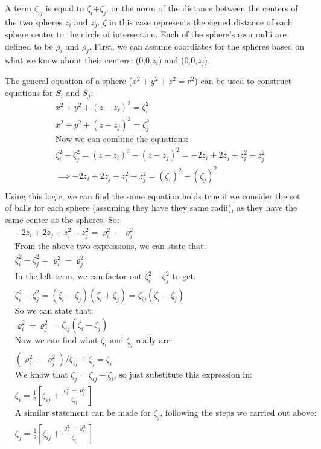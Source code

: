 \documentclass{article}
\begin{document}
A term $\zeta_{ij}$ is equal to  $\zeta_i$+$\zeta_j$, or the norm of the distance between the centers of the two spheres $z_i$ and $z_j$. $\zeta$ in this case represents the signed distance of each sphere center to the circle of intersection. Each of the sphere's own radii are defined to be $\rho_i$ and $\rho_j$. First, we can assume coordiates for the spheres based on what we know about their centers:
(0,0,$z_i$) and (0,0,$z_j$).


The general equation of a sphere ($x^2 + y^2 +z^2 = r^2$) can be used to construct equations for $S_i$ and $S_j$:
\begin{align*}
&x^2 + y^2 +(z-z_i)^2 = \zeta_i^2 \\
&x^2 + y^2 +(z-z_j)^2 = \zeta_j^2 \\
&\text{Now we can combine the equations:} \\
&\zeta_i^2-\zeta_j^2 =(z-z_i)^2-(z-z_j)^2=-2z_i +2z_j +z_i^2 - z_j^2\\
& \implies -2z_i +2z_j +z_i^2 - z_j^2 = (\zeta_i)^2-(\zeta_j)^2\\
\end{align*}
Using this logic, we can find the same equation holds true if we consider the set of balls for each sphere (assuming they have they same radii), as they have the same center as the spheres. So:
\begin{align*}
&-2z_i +2z_j +z_i^2 - z_j^2 = \varrho_i^2-\varrho_j^2 \\
&\text{From the above two expressions, we can state that:} \\
&\zeta_i^2-\zeta_j^2 = \varrho_i^2-\varrho_j^2\\
&\text{In the left term, we can factor out $\zeta_i^2-\zeta_j^2$ to get:} \\
&\zeta_i^2-\zeta_j^2 =(\zeta_i-\zeta_j)(\zeta_i+\zeta_j) = \zeta_{ij}(\zeta_i-\zeta_j) \\
&\text{So we can state that:} \\
&\varrho_i^2 - \varrho_j^2  = \zeta_{ij}(\zeta_i-\zeta_j) \\
&\text{Now we can find what $\zeta_i$ and $\zeta_j$ really are} \\
&(\varrho_i^2 - \varrho_j^2)/\zeta_{ij} + \zeta_j = \zeta_i \\
&\text{We know that $\zeta_j = \zeta_{ij} - \zeta_i$, so just substitute this expression in:} \\
&\zeta_i = \frac{1}{2}\left[\zeta_{ij}+\frac{\varrho_i^2-\varrho_j^2}{\zeta_{ij}}\right] \\
&\text{A similar statement can be made for $\zeta_j$, following the steps we carried out above:} \\
&\zeta_j = \frac{1}{2}\left[\zeta_{ij}+\frac{\varrho_j^2-\varrho_i^2}{\zeta_{ij}}\right]
\end{align*}
\end{document}
